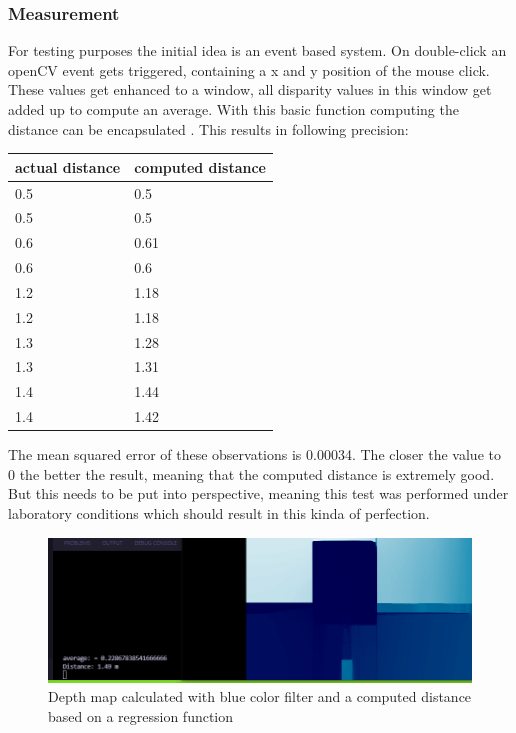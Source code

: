 \documentclass[journal,onecolumn]{IEEEtran}
\begin{document}
\subsubsection{Measurement}
For testing purposes the initial idea is an event based system. On double-click an openCV event gets triggered, containing a x and y position of the mouse click. These values get enhanced to a window, all disparity values in this window get added up to compute an average. With this basic function computing the distance can be encapsulated . This results in following precision:
\begin{table}[H]
	\begin{tabular}{|l|l|}
		\hline
		actual distance & computed distance \\ \hline
		0.5             & 0.5               \\ \hline
		0.5             & 0.5               \\ \hline
		0.6             & 0.61              \\ \hline
		0.6             & 0.6               \\ \hline
		1.2             & 1.18              \\ \hline
		1.2             & 1.18              \\ \hline
		1.3             & 1.28              \\ \hline
		1.3             & 1.31              \\ \hline
		1.4             & 1.44              \\ \hline
		1.4             & 1.42              \\ \hline
	\end{tabular}
\end{table}
\noindent The mean squared error of these observations is 0.00034. The closer the value to 0 the better the result, meaning that the computed distance is extremely good. But this needs to be put into perspective, meaning this test was performed under laboratory conditions which should result in this kinda of perfection.
\begin{figure}[H]
	\centering
	\includegraphics[scale=0.5]{distanceCalcRegression.png}
	\captionsetup{justification=centering}
	\caption{Depth map calculated with blue color filter and a computed distance based on a regression function}
\end{figure}
\end{document}
